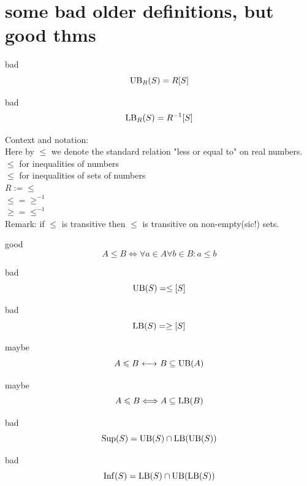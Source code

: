 \section{some bad older definitions, but good thms}
\begin{definition}bad
\[
\mathrm{UB}_R(S) = R[S]
\]
\end{definition}
\begin{definition}bad
\[\mathrm{LB}_R(S) = R^{-1}[S]\]
\end{definition}

Context and notation:\\
Here by $\leq$ we denote the standard relation "less or equal to" on real numbers.
$\leq$ for inequalities of numbers\\
$\leqslant$ for inequalities of sets of numbers\\
$R := \leq$\\
$\leq = \geq^{-1}$\\
$\geq = \leq^{-1}$\\
Remark: if $\leq$ is transitive then $\leqslant$ is transitive on non-empty(sic!) sets.
\noindent

\begin{definition}good
\[
A \leqslant B
\iff
\forall a\in A \forall b\in B: a\leq b
\]
\end{definition}
\begin{definition}bad
\[
\mathrm{UB}(S) = \leq [S]
\]
\end{definition}
\begin{definition}bad
\[
\mathrm{LB}(S) = \geq [S]
\]
\end{definition}

\begin{theorem}maybe
\[
A\leqslant B {\ \longleftrightarrow\ } B\subseteq \mathrm{UB}(A)
\]
\end{theorem}
\begin{theorem}maybe
\[
A\leqslant B \Longleftrightarrow A\subseteq \mathrm{LB}(B)
\]
\end{theorem}

\begin{definition}bad
\[
\mathrm{Sup}(S) = \mathrm{UB}(S)\cap \mathrm{LB}(\mathrm{UB}(S))
\]
\end{definition}
\begin{definition}bad
\[
\mathrm{Inf}(S) = \mathrm{LB}(S)\cap \mathrm{UB}(\mathrm{LB}(S))
\]
\end{definition}


